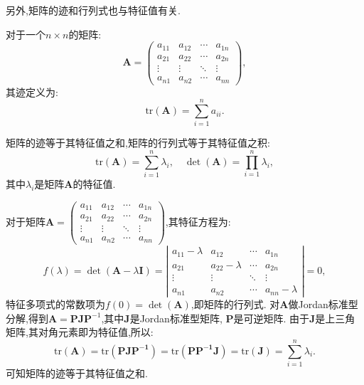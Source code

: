 另外,矩阵的迹和行列式也与特征值有关. 
\begin{defn}\cite{treil2016linear}
    对于一个$n \times n$的矩阵:
    \begin{equation}
        \mathbf{A}=\begin{pmatrix}
            a_{11} & a_{12} & \cdots & a_{1n} \\
            a_{21} & a_{22} & \cdots & a_{2n} \\
            \vdots & \vdots & \ddots & \vdots \\
            a_{n1} & a_{n2} & \cdots & a_{nn}
        \end{pmatrix},
    \end{equation}
    其迹定义为:
    \begin{equation}
        \text{tr}(\mathbf{A}) = \sum_{i=1}^{n} a_{ii}.
    \end{equation}
\end{defn}
\begin{thm}\label{thm:trace_det}\cite{treil2016linear}
    矩阵的迹等于其特征值之和,矩阵的行列式等于其特征值之积:
    \begin{equation}
        \text{tr}(\mathbf{A}) = \sum_{i=1}^{n} \lambda_i,\quad \det(\mathbf{A}) = \prod_{i=1}^{n} \lambda_i,
    \end{equation}
    其中$\lambda_i$是矩阵$\mathbf{A}$的特征值. 
\end{thm}
\begin{pf}
   对于矩阵$\mathbf{A}= \begin{pmatrix}
    a_{11} & a_{12} & \cdots & a_{1n} \\
    a_{21} & a_{22} & \cdots & a_{2n} \\
    \vdots & \vdots & \ddots & \vdots \\
    a_{n1} & a_{n2} & \cdots & a_{nn}
\end{pmatrix}$,其特征方程为:
\begin{equation}\label{eq:char_eq}
    f(\lambda)=\det(\mathbf{A} - \lambda \mathbf{I}) = \left| \begin{array}{cccc}
        a_{11}-\lambda & a_{12} & \cdots & a_{1n} \\
        a_{21} & a_{22}-\lambda & \cdots & a_{2n} \\
        \vdots & \vdots & \ddots & \vdots \\
        a_{n1} & a_{n2} & \cdots & a_{nn}-\lambda
    \end{array} \right| = 0,
\end{equation}
特征多项式的常数项为$f(0)=\det(\mathbf{A})$,即矩阵的行列式. 
对$\mathbf{A}$做Jordan标准型分解,得到$\mathbf{A}= \mathbf{P} \mathbf{J} \mathbf{P}^{-1}$,其中$\mathbf{J}$是Jordan标准型矩阵, $\mathbf{P}$是可逆矩阵. 由于$\mathbf{J}$是上三角矩阵,其对角元素即为特征值,所以:
\begin{equation}
    \text{tr}(\mathbf{A})=\text{tr}(\mathbf{PJP^{-1}})=\text{tr}(\mathbf{PP^{-1}J})=\text{tr}(\mathbf{J})=\sum_{i=1}^{n} \lambda_i.
\end{equation}
可知矩阵的迹等于其特征值之和. 
\end{pf}
